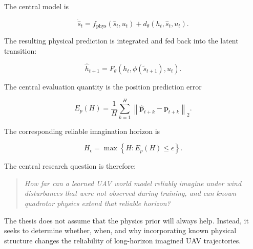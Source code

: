\documentclass[conference]{IEEEtran}
\begin{document}
The central model is

\begin{equation}
\boxed{
\dot{\hat{s}}_t
=
f_{\mathrm{phys}}
(\hat{s}_t,u_t)
+
d_{\theta}
(h_t,\hat{s}_t,u_t).
}
\end{equation}

The resulting physical prediction is integrated and fed back into the
latent transition:

\begin{equation}
\boxed{
\hat{h}_{t+1}
=
F_{\theta}
\left(
h_t,
\phi(\tilde{s}_{t+1}),
u_t
\right).
}
\end{equation}

The central evaluation quantity is the position prediction error

\begin{equation}
\boxed{
E_p(H)
=
\frac{1}{H}
\sum_{k=1}^{H}
\left\|
\hat{\mathbf p}_{t+k}
-
\mathbf p_{t+k}
\right\|_2.
}
\end{equation}

The corresponding reliable imagination horizon is

\begin{equation}
\boxed{
H_{\epsilon}
=
\max
\left\{
H:E_p(H)\leq\epsilon
\right\}.
}
\end{equation}

The central research question is therefore:

\begin{quote}
\itshape
How far can a learned UAV world model reliably imagine under wind
disturbances that were not observed during training, and can known
quadrotor physics extend that reliable horizon?
\end{quote}

The thesis does not assume that the physics prior will always help. Instead, it seeks to determine whether, when, and why incorporating known physical structure changes the reliability of long-horizon imagined UAV trajectories.
\end{document}
